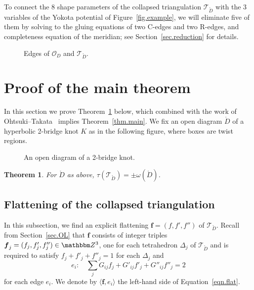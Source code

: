 \documentclass[12pt,reqno]{amsart}
\newtheorem{theorem}{Theorem}[section]
\theoremstyle{definition}
\def\BZ{\mathbbm Z}
\def\calO{\mathcal O}
\def\calT{\mathcal T}
\renewcommand{\Ddot}{\mathring{D}}
\begin{document}
To connect the 8 shape parameters of the collapsed triangulation $\calT_{\Ddot}$
with the 3 variables of the Yokota potential of Figure~\ref{fig.example}, we will
eliminate five of them by solving to the gluing equations of two C-edges  and two
R-edges, and completeness equation of the meridian; see Section~\ref{sec.reduction}
for details.

\begin{figure}[htpb!]

\caption{Edges of $\calO_D$ and $\calT_{\Ddot}$.}
\label{fig.examplecc}
\end{figure}


\section{Proof of the main theorem}
\label{sec.pf}

In this section we prove Theorem~\ref{thm.main2} below, which combined with the work
of Ohtsuki--Takata~\cite{OT2015} implies Theorem~\ref{thm.main}.
We fix an open diagram $\Ddot$ of a hyperbolic 2-bridge knot $K$ as in the
following figure, where boxes are twist regions.

\begin{figure}[htpb!]

\caption{An open diagram of a 2-bridge knot.}
\label{fig.planardiagram}
\end{figure}

\begin{theorem}
\label{thm.main2}
For $\Ddot$ as above, $\tau(\calT_{\Ddot})=\pm\omega(\Ddot)$. 
\end{theorem}

\subsection{Flattening of the collapsed triangulation}
\label{sec.flat}

In this subsection, we find an explicit flattening ${\boldsymbol f}=(f,f',f'')$
of $\calT_{\Ddot}$. Recall from Section~\ref{sec.OL} that ${\boldsymbol f}$ consists
of integer triples ${\boldsymbol f}_j=(f_j,f'_j,f''_j) \in \BZ^3$, one for each
tetrahedron $\Delta_j$ of $\calT_{\Ddot}$ and is required to satisfy
$f_j + f'_j +f''_j =1$ for each $\Delta_j$ and
\begin{equation}
\label{eqn.flat}
e_i : \quad \sum_{j} G_{ij} f_j +  G'_{ij} f'_j  + G''_{ij} f''_j  =2
\end{equation}
for each edge $e_i$. We denote by $\langle {\boldsymbol f}, e_i \rangle$
the left-hand side of Equation~\eqref{eqn.flat}.
\end{document}

